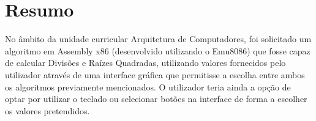 \chapter*{Resumo}
No âmbito da unidade curricular Arquitetura de Computadores, foi solicitado um algoritmo em Assembly x86 (desenvolvido utilizando o Emu8086) que fosse capaz de calcular Divisões e Raízes Quadradas, utilizando valores fornecidos pelo utilizador através de uma interface gráfica que permitisse a escolha entre ambos os algoritmos previamente mencionados. O utilizador teria ainda a opção de optar por utilizar o teclado ou selecionar botões na interface de forma a escolher os valores pretendidos. \\

